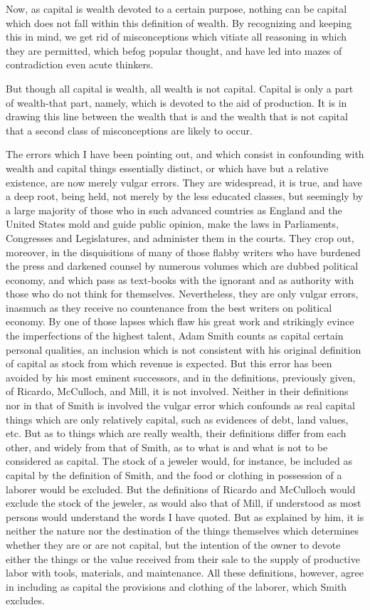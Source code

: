 Now, as capital is wealth devoted to a certain purpose, nothing can be
capital which does not fall within this definition of wealth. By
recognizing and keeping this in mind, we get rid of misconceptions which
vitiate all reasoning in which they are permitted, which befog popular
thought, and have led into mazes of contradiction even acute thinkers.

But though all capital is wealth, all wealth is not capital. Capital is
only a part of wealth-that part, namely, which is devoted to the aid of
production. It is in drawing this line between the wealth that is and
the wealth that is not capital that a second class of misconceptions are
likely to occur.

The errors which I have been pointing out, and which consist in
confounding with wealth and capital things essentially distinct, or
which have but a relative existence, are now merely vulgar errors. They
are widespread, it is true, and have a deep root, being held, not merely
by the less educated classes, but seemingly by a large majority of those
who in such advanced countries as England and the United States mold and
guide public opinion, make the laws in Parliaments, Congresses and
Legislatures, and administer them in the courts. They crop out,
moreover, in the disquisitions of many of those flabby writers who have
burdened the press and darkened counsel by numerous volumes which are
dubbed political economy, and which pass as text-books with the ignorant
and as authority with those who do not think for themselves.
Nevertheless, they are only vulgar errors, inasmuch as they receive no
countenance from the best writers on political economy. By one of those
lapses which flaw his great work and strikingly evince the imperfections
of the highest talent, Adam Smith counts as capital certain personal
qualities, an inclusion which is not consistent with his original
definition of capital as stock from which revenue is expected. But this
error has been avoided by his most eminent successors, and in the
definitions, previously given, of Ricardo, McCulloch, and Mill, it is
not involved. Neither in their definitions nor in that of Smith is
involved the vulgar error which confounds as real capital things which
are only relatively capital, such as evidences of debt, land values,
etc. But as to things which are really wealth, their definitions differ
from each other, and widely from that of Smith, as to what is and what
is not to be considered as capital. The stock of a jeweler would, for
instance, be included as capital by the definition of Smith, and the
food or clothing in possession of a laborer would be excluded. But the
definitions of Ricardo and McCulloch would exclude the stock of the
jeweler, as would also that of Mill, if understood as most persons would
understand the words I have quoted. But as explained by him, it is
neither the nature nor the destination of the things themselves which
determines whether they are or are not capital, but the intention of the
owner to devote either the things or the value received from their sale
to the supply of productive labor with tools, materials, and
maintenance. All these definitions, however, agree in including as
capital the provisions and clothing of the laborer, which Smith
excludes.

